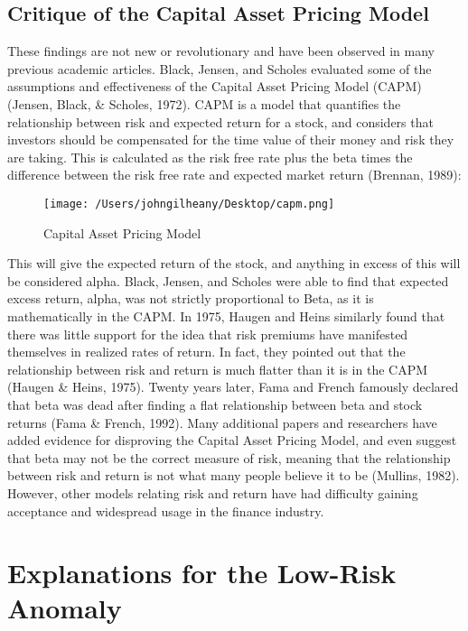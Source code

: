 \documentclass[12pt,twoside]{reedthesis}
\theoremstyle{definition}
\theoremstyle{definition}
\theoremstyle{definition}
\theoremstyle{remark}
\begin{document}
\subsection{Critique of the Capital Asset Pricing
Model}\label{critique-of-the-capital-asset-pricing-model}

These findings are not new or revolutionary and have been observed in
many previous academic articles. Black, Jensen, and Scholes evaluated
some of the assumptions and effectiveness of the Capital Asset Pricing
Model (CAPM) (Jensen, Black, \& Scholes, 1972). CAPM is a model that
quantifies the relationship between risk and expected return for a
stock, and considers that investors should be compensated for the time
value of their money and risk they are taking. This is calculated as the
risk free rate plus the beta times the difference between the risk free
rate and expected market return (Brennan, 1989):
\begin{figure}
\centerline{\texttt{[image: /Users/johngilheany/Desktop/capm.png]}}
\caption{Capital Asset Pricing Model}
\label{CAPM}
\end{figure}
This will give the expected return of the stock, and anything in excess
of this will be considered alpha. Black, Jensen, and Scholes were able
to find that expected excess return, alpha, was not strictly
proportional to Beta, as it is mathematically in the CAPM. In 1975,
Haugen and Heins similarly found that there was little support for the
idea that risk premiums have manifested themselves in realized rates of
return. In fact, they pointed out that the relationship between risk and
return is much flatter than it is in the CAPM (Haugen \& Heins, 1975).
Twenty years later, Fama and French famously declared that beta was dead
after finding a flat relationship between beta and stock returns (Fama
\& French, 1992). Many additional papers and researchers have added
evidence for disproving the Capital Asset Pricing Model, and even
suggest that beta may not be the correct measure of risk, meaning that
the relationship between risk and return is not what many people believe
it to be (Mullins, 1982). However, other models relating risk and return
have had difficulty gaining acceptance and widespread usage in the
finance industry.

\section{Explanations for the Low-Risk
Anomaly}\label{explanations-for-the-low-risk-anomaly}
\end{document}
